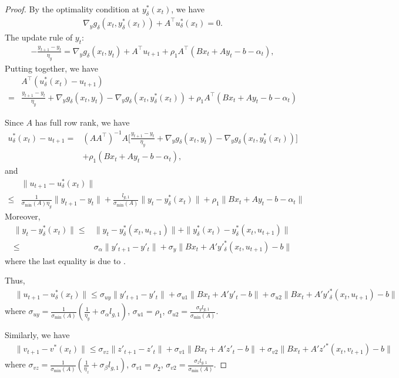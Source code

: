 \documentclass{article}
\theoremstyle{plain}
\theoremstyle{definition}
\theoremstyle{remark}
\begin{document}
\begin{proof}
By the optimality condition at $y^*_\delta(x_t)$, we have
\begin{align*}
    \nabla_y g_\delta(x_t,y^*_\delta(x_t))+A^\top u^*_\delta(x_t)=0.
\end{align*}
The update rule of $y_t$:
    \begin{align*}
        -\frac{y_{t+1}-y_t}{\eta_y}=\nabla_y g_\delta(x_t,y_t)+A^\top u_{t+1}+\rho_1 A^\top(Bx_t+Ay_t-b-\alpha_t),
    \end{align*}
Putting together, we have
\begin{align*}
    &A^\top(u^*_\delta(x_t)-u_{t+1})\\
    =&\frac{y_{t+1}-y_t}{\eta_y}+\nabla_y g_\delta(x_t,y_t)-\nabla_y g_\delta(x_t,y^*_\delta(x_t))+\rho_1 A^\top(Bx_t+Ay_t-b-\alpha_t)
\end{align*}

Since $A$ has full row rank, we have
\begin{align*}
    u^*_\delta(x_t)-u_{t+1}=&(AA^\top)^{-1}A\bigg[\frac{y_{t+1}-y_t}{\eta_y}+\nabla_y g_\delta(x_t,y_t)-\nabla_y g_\delta(x_t,y^*_\delta(x_t))\bigg]\\
    &+\rho_1 (Bx_t+Ay_t-b-\alpha_t),
\end{align*}
and
\begin{align*}
    &\|u_{t+1}-u^*_\delta(x_t)\|\\
    \leq&\frac{1}{\sigma_{\min}(A)\eta_y}\|y_{t+1}-y_t\|+\frac{l_{g,1}}{\sigma_{\min}(A)}\|y_t-y^*_\delta(x_t)\|+\rho_1\|Bx_t+Ay_t-b-\alpha_t\|
\end{align*}
Moreover,
\begin{align*}
    \|y_t-y^*_\delta(x_t)\|\leq& \|y_t-y^*_\delta(x_t, u_{t+1})\|+\|y^*_\delta(x_t)-y^*_\delta(x_t, u_{t+1})\|\\
    \leq& \sigma_\alpha\|y'_{t+1}-y'_t\|+\sigma_y\|Bx_t+A'y'^*_\delta(x_t, u_{t+1})-b\|
\end{align*}
where the last equality is due to .

Thus, 
\begin{align*}
    &\|u_{t+1}-u^*_\delta(x_t)\|\leq \sigma_{uy}\|y'_{t+1}-y'_t\|+\sigma_{u1}\|Bx_t+A'y'_t-b\|+\sigma_{u2}\|Bx_t+A'y'^*_\delta(x_t, u_{t+1})-b\|
\end{align*}
where $\sigma_{uy}=\frac{1}{\sigma_{\min}(A)}(\frac{1}{\eta_y}+\sigma_\alpha l_{g,1})$, $\sigma_{u1}=\rho_1$, $\sigma_{u2}=\frac{\sigma_y l_{g,1}}{\sigma_{\min}(A)}$.

Similarly, we have
\begin{align*}
    &\|v_{t+1}-v^*(x_t)\|\leq \sigma_{vz}\|z'_{t+1}-z'_t\|+\sigma_{v1}\|Bx_t+A'z'_t-b\|+\sigma_{v2}\|Bx_t+A'z'^*(x_t, v_{t+1})-b\|
\end{align*}
where $\sigma_{vz}=\frac{1}{\sigma_{\min}(A)}(\frac{1}{\eta_z}+\sigma_\beta l_{g,1})$, $\sigma_{v1}=\rho_2$, $\sigma_{v2}=\frac{\sigma_z l_{g,1}}{\sigma_{\min}(A)}$.

\end{proof}
\end{document}
